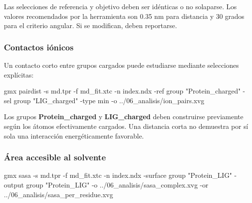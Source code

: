 \documentclass[
  spanish,
  11pt,
  a4paper]{article}
\newenvironment{Shaded}{\begin{snugshade}}{\end{snugshade}}
\newcommand{\AttributeTok}[1]{\textcolor[rgb]{0.13,0.29,0.53}{#1}}
\newcommand{\ExtensionTok}[1]{#1}
\newcommand{\NormalTok}[1]{#1}
\newcommand{\StringTok}[1]{\textcolor[rgb]{0.31,0.60,0.02}{#1}}
\begin{document}
Las selecciones de referencia y objetivo deben ser idénticas o no
solaparse. Los valores recomendados por la herramienta son 0.35 nm para
distancia y 30 grados para el criterio angular. Si se modifican, deben
reportarse.

\subsubsection{Contactos iónicos}\label{contactos-iuxf3nicos}

Un contacto corto entre grupos cargados puede estudiarse mediante
selecciones explícitas:

\begin{Shaded}
\begin{Highlighting}[]
\ExtensionTok{gmx}\NormalTok{ pairdist     }\AttributeTok{{-}s}\NormalTok{ md.tpr     }\AttributeTok{{-}f}\NormalTok{ md\_fit.xtc     }\AttributeTok{{-}n}\NormalTok{ index.ndx     }\AttributeTok{{-}ref} \StringTok{\textquotesingle{}group "Protein\_charged"\textquotesingle{}}     \AttributeTok{{-}sel} \StringTok{\textquotesingle{}group "LIG\_charged"\textquotesingle{}}     \AttributeTok{{-}type}\NormalTok{ min     }\AttributeTok{{-}o}\NormalTok{ ../06\_analisis/ion\_pairs.xvg}
\end{Highlighting}
\end{Shaded}

Los grupos \textbf{Protein\_charged} y \textbf{LIG\_charged} deben
construirse previamente según los átomos efectivamente cargados. Una
distancia corta no demuestra por sí sola una interacción energéticamente
favorable.

\subsubsection{Área accesible al
solvente}\label{uxe1rea-accesible-al-solvente}

\begin{Shaded}
\begin{Highlighting}[]
\ExtensionTok{gmx}\NormalTok{ sasa     }\AttributeTok{{-}s}\NormalTok{ md.tpr     }\AttributeTok{{-}f}\NormalTok{ md\_fit.xtc     }\AttributeTok{{-}n}\NormalTok{ index.ndx     }\AttributeTok{{-}surface} \StringTok{\textquotesingle{}group "Protein\_LIG"\textquotesingle{}}     \AttributeTok{{-}output} \StringTok{\textquotesingle{}group "Protein\_LIG"\textquotesingle{}}     \AttributeTok{{-}o}\NormalTok{ ../06\_analisis/sasa\_complex.xvg     }\AttributeTok{{-}or}\NormalTok{ ../06\_analisis/sasa\_per\_residue.xvg}
\end{Highlighting}
\end{Shaded}
\end{document}
